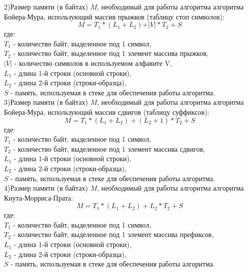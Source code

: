 \documentclass[a4paper,12pt]{article}
\begin{document}
2)Размер памяти (в байтах) $M$, необходимый для работы алгоритма алгоритма Бойера-Мура, использующий массив прыжков (таблицу стоп символов):\\
\begin{equation}
M = T_1 * (L_1 + L_2) + \vert V \vert * T_2 + S
\end{equation} 
где:\\
$T_1$ - количество байт, выделенное под 1 символ,\\
$T_2$ - количество байт, выделенное под 1 элемент массива прыжков,\\
$\vert V \vert$ - количество символов в используемом алфавите V,\\
$L_1$ - длина 1-й строки (основной строки),\\
$L_2$ - длина 2-й строки (строки-образца),\\
$S$ - память, используемая в стеке для обеспечения работы алгоритма. \\

3)Размер памяти (в байтах) $M$, необходимый для работы алгоритма алгоритма Бойера-Мура, использующий массив сдвигов (таблицу суффиксов):\\
\begin{equation}
M = T_1 * (L_1 + L_2) + (L_2 + 1) * T_2 + S
\end{equation}
где:\\
$T_1$ - количество байт, выделенное под 1 символ,\\
$T_2$ - количество байт, выделенное под 1 элемент массива сдвигов,\\
$L_1$ - длина 1-й строки (основной строки),\\
$L_2$ - длина 2-й строки (строки-образца),\\
$S$ - память, используемая в стеке для обеспечения работы алгоритма. \\

4)Размер памяти (в байтах) $M$, необходимый для работы алгоритма алгоритма Кнута-Морриса-Прата:\\
\begin{equation}
M = T_1 * (L_1 + L_2) + L_2 * T_2 + S
\end{equation}
где:\\
$T_1$ - количество байт, выделенное под 1 символ,\\
$T_2$ - количество байт, выделенное под 1 элемент массива префиксов,\\
$L_1$ - длина 1-й строки (основной строки),\\
$L_2$ - длина 2-й строки (строки-образца),\\
$S$ - память, используемая в стеке для обеспечения работы алгоритма. \\
\end{document}
